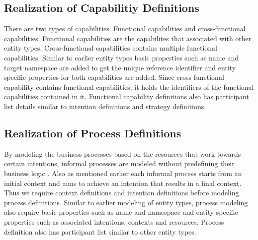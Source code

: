\subsection{Realization of Capabilitiy Definitions}
There are two types of capabilities. Functional capabilities and cross-functional capabilities. Functional capabilities are the capabilites that associated with other entity types. Cross-functional capabilities contains multiple functional capabilities. Similar to earlier entity types basic properties such as name and target namespace are added to get the unique reference identifier and entity specific properties for both capabilities are added. Since cross functional capability contains functional capabilities, it holds the identifiers of the functional capabilities contained in it. Functional capability definitions also has participant list details similar to intention definitions and strategy definitions. 

\subsection{Realization of Process Definitions}
By modeling the business processes based on the resources that work towards certain intentions, informal processes are modeled without predefining their business logic \cite{Sungur2014a}. Also as mentioned earlier each informal process starts from an initial context and aims to achieve an intention that results in a final context. Thus we require context definitions and intention definitions before modeling process definitions. Similar to earlier modeling of entity types, process modeling also require basic properties such as name and namespace  and entity specific properties such as associated intentions, contexts and resources. Process definition also has participant list similar to other entity types. 

